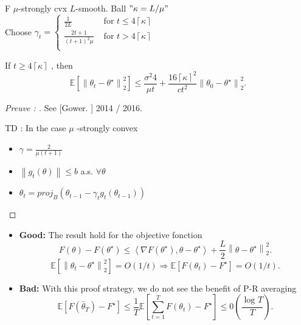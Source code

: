 \begin{thm}[]
    F $\mu$-strongly cvx $L$-smooth. Ball $"\kappa = L/ \mu "$ \\
    Choose $\gamma _t = \begin{cases}
        \frac{1}{2L} &\text{ for } t \leq 4 \left\lceil \kappa  \right\rceil \\
        \frac{2t+1}{(t+1)^2 \mu} &\text{ for } t > 4 \left\lceil \kappa  \right\rceil \\
    \end{cases} $

    If $ t \geq 4 \left\lceil \kappa \right\rceil  $ , then 
    \[
        \mathbb{E}[\left\| \theta _t - \theta ^\star  \right\| _2 ^2 ] \leq \frac{\sigma ^2 4}{\mu t} + \frac{16 \left\lceil \kappa  \right\rceil ^2 }{c t^2} \left\| \theta _0 - \theta ^\star  \right\| _2 ^2
    .\]
    
\end{thm}

\begin{proof}[Preuve : ]
    See [Gower. ] 2014 / 2016. 
    
    TD : In the case $ \mu  $ -strongly convex \begin{itemize}
        \item $ \gamma = \frac{2}{\mu (t+1)} $
        \item $ \left\| g_t (\theta ) \right\| \leq b $  a.s. $ \forall \theta  $ 
        \item $ \theta _t = proj_B (\theta _{t-1} - \gamma _t g_t (\theta _{t-1})) $ 
    \end{itemize}
\end{proof}

\begin{note}[]
    \begin{itemize}
        \item \textbf{Good: } The result hold for the objective fonction 
        \[
            F(\theta ) - F(\theta ^\star ) \leq \left\langle \nabla F(\theta ^\star ), \theta - \theta ^\star  \right\rangle  + \frac{L}{2} \left\| \theta - \theta ^\star  \right\| _2 ^2 
        .\]
        \[
            \mathbb{E}[\left\| \theta _t - \theta ^\star  \right\| _2 ^2] = O(1/t) \Rightarrow \mathbb{E}[F(\theta _t) - F^\star ] = O(1/t)
        .\]
        
        \item \textbf{Bad: } With this proof strategy, we do not see the benefit of P-R averaging
        \[
            \mathbb{E}[F ( \bar{\theta}_T ) - F^\star ] \leq \frac{1}{T} \mathbb{E}[ \sum_{t=1}^{T} F(\theta _t) - F^\star ] \leq 0(\frac{\log_{} T  }{T})
        .\]
    \end{itemize}
\end{note}

